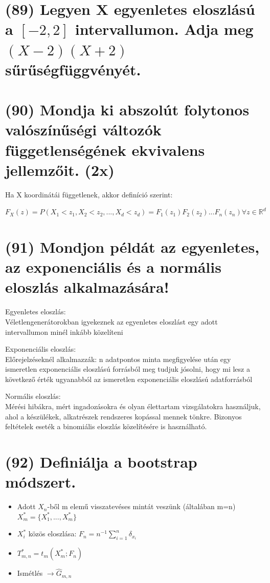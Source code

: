 \documentclass[12p]{article}
\begin{document}
\section{(89)  Legyen X egyenletes eloszlású a $[-2,2]$ intervallumon. Adja meg $(X - 2)(X + 2)$ sűrűségfüggvényét.}

\section{(90) Mondja ki abszolút folytonos valószínűségi változók függetlenségének ekvivalens jellemzőit. (2x)}

Ha X koordinátái függetlenek, akkor definíció szerint:

$F_X(z) = P(X_1<z_1, X_2<z_2, ..., X_d<z_d) = F_1(z_1)F_2(z_2)...F_n(z_n) \forall z \in \mathbb{R}^d$

\section{(91) Mondjon példát az egyenletes, az exponenciális és a normális eloszlás alkalmazására!}

Egyenletes eloszlás:\\
Véletlengenerátorokban igyekeznek az egyenletes eloszlást egy adott intervallumon minél inkább közelíteni

Exponenciális eloszlás:\\
Előrejelzéseknél alkalmazzák: n adatpontos minta megfigyelése után egy ismeretlen exponenciális eloszlású forrásból meg tudjuk jósolni, hogy mi lesz a következő érték ugyanabból az ismeretlen exponenciális eloszlású adatforrásból

Normális eloszlás:\\
Mérési hibákra, mért ingadozásokra és olyan élettartam vizsgálatokra használjuk, ahol a készülékek, alkatrészek rendszeres kopással mennek tönkre. Bizonyos feltételek eseték a binomiális eloszlás közelítésére is használható.

\section{(92) Definiálja a bootstrap módszert.}

\begin{itemize}
	\item Adott $X_n$-ből m elemű visszatevéses mintát veszünk (általában m=n) \quad $X^{*}_m = \{X^{*}_1,...,X^{*}_m\}$
	\item $X_i^{*}$ közös eloszlása: $F_n = n^{-1} \sum^n_{i=1} \delta_{x_i}$
	\item $T^{*}_{m,n} = t_m (X^{*}_m;F_n)$
	\item Ismétlés $\rightarrow \hat{G}_{m,n}$
	
\end{itemize}
\end{document}
